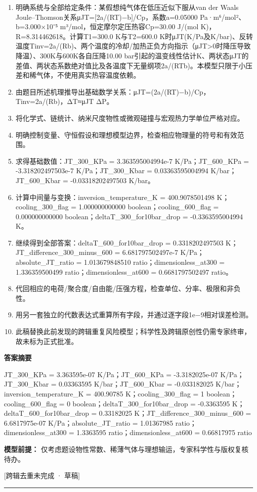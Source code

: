 \documentclass[UTF8,11pt,a4paper]{ctexart}
\begin{document}
\begin{enumerate}
\item 明确系统与全部给定条件：某假想纯气体在低压近似下服从van der Waals Joule–Thomson关系μJT=[2a/(RT)−b]/Cp，系数a=0.05000 Pa·m⁶/mol²、b=3.000×10⁻⁵ m³/mol，恒定摩尔定压热容Cp=30.00 J/(mol K)，R=8.314462618。计算T1=300.0 K与T2=600.0 K时μJT(K/Pa及K/bar)、反转温度Tinv=2a/(Rb)、两个温度的冷却/加热正负方向指示（μJT>0时降压导致降温）、300K与600K各自压降10.00 bar引起的温变线性估计K、两状态μJT的差值、两状态系数绝对值比及各温度下无量纲项2a/(RTb)。本模型只限于小压差和稀气体，不使用真实热容温度依赖。
\item 由题目所述机理推导出基础数学关系：μJT=(2a/(RT)−b)/Cp，Tinv=2a/(Rb)，ΔT≈μJT ΔP。
\item 将化学式、链统计、纳米尺度物性或微观碰撞与宏观热力学单位严格对应。
\item 明确控制变量、守恒假设和理想模型边界，检查相应物理量的符号和有效范围。
\item 求得基础数值：JT\_300\_KPa = 3.363595004994e-7 K/Pa；JT\_600\_KPa = -3.318202497503e-7 K/Pa；JT\_300\_Kbar = 0.03363595004994 K/bar；JT\_600\_Kbar = -0.03318202497503 K/bar。
\item 计算中间量与变换：inversion\_temperature\_K = 400.9078501498 K；cooling\_300\_flag = 1.000000000000 boolean；cooling\_600\_flag = 0.000000000000 boolean；deltaT\_300\_for10bar\_drop = -0.3363595004994 K。
\item 继续得到全部答案：deltaT\_600\_for10bar\_drop = 0.3318202497503 K；JT\_difference\_300\_minus\_600 = 6.681797502497e-7 K/Pa；absolute\_JT\_ratio = 1.013679848510 ratio；dimensionless\_at300 = 1.336359500499 ratio；dimensionless\_at600 = 0.6681797502497 ratio。
\item 代回相应的电荷/聚合度/自由能/压强方程，检查单位、分率、极限和非负性。
\item 用另一套独立的代数表达式重算所有字段，并通过逐字段1e−9相对误差检测。
\item 此稿替换此前发现的跨辑重复风险模型；科学性及跨辑原创性仍需专家终审，故未标为正式批准。
\end{enumerate}
\noindent\textbf{答案摘要}\par
JT\_300\_KPa = 3.363595e-07 K/Pa；JT\_600\_KPa = -3.3182025e-07 K/Pa；JT\_300\_Kbar = 0.03363595 K/bar；JT\_600\_Kbar = -0.033182025 K/bar；inversion\_temperature\_K = 400.90785 K；cooling\_300\_flag = 1 boolean；cooling\_600\_flag = 0 boolean；deltaT\_300\_for10bar\_drop = -0.3363595 K；deltaT\_600\_for10bar\_drop = 0.33182025 K；JT\_difference\_300\_minus\_600 = 6.6817975e-07 K/Pa；absolute\_JT\_ratio = 1.01367985 ratio；dimensionless\_at300 = 1.3363595 ratio；dimensionless\_at600 = 0.66817975 ratio\par
\noindent\textbf{模型前提：}
仅考虑题设物性常数、稀薄气体与理想输运，专家科学性与版权复核待办。\par
\noindent\textcolor{red!65!black}{[跨辑去重未完成 · 草稿]} \par
\medskip\hrule\medskip
{}
\end{document}
